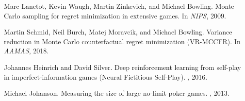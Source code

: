 \documentclass[11pt,a4paper]{article}
\begin{document}
\begin{thebibliography}{99}
Marc Lanctot, Kevin Waugh, Martin Zinkevich, and Michael Bowling.
\newblock Monte Carlo sampling for regret minimization in extensive games.
\newblock In {\em NIPS}, 2009.

Martin Schmid, Neil Burch, Matej Moravcik, and Michael Bowling.
\newblock Variance reduction in Monte Carlo counterfactual regret minimization (VR-MCCFR).
\newblock In {\em AAMAS}, 2018.

Johannes Heinrich and David Silver.
\newblock Deep reinforcement learning from self-play in imperfect-information games (Neural Fictitious Self-Play).
, 2016.

Michael Johanson.
\newblock Measuring the size of large no-limit poker games.
, 2013.

\end{thebibliography}
\end{document}
